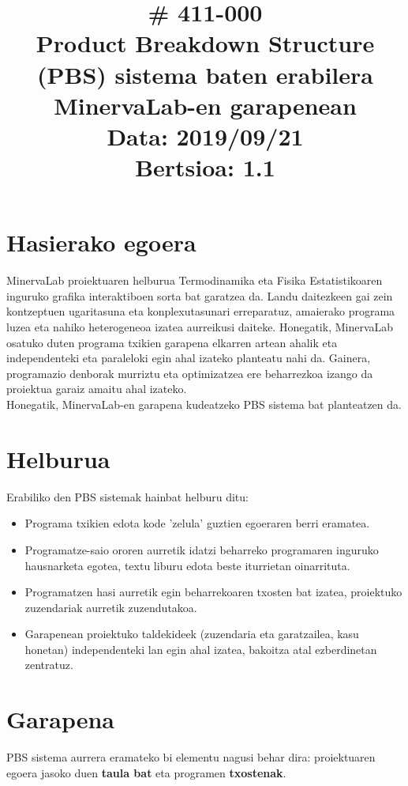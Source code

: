 \documentclass[10pt,a4paper]{article}
\title{\cf \# 411-000 \\ \vspace{5mm}
					Product Breakdown Structure (PBS) sistema baten erabilera MinervaLab-en garapenean \\
\normalsize \vspace{5mm} Data: 2019/09/21 \\
 			\vspace{3mm} Bertsioa: 1.1}
\date{}
\begin{document}
\maketitle
\thispagestyle{fancy}

\section{Hasierako egoera}
MinervaLab proiektuaren helburua Termodinamika eta Fisika Estatistikoaren inguruko grafika interaktiboen sorta bat garatzea da. Landu daitezkeen gai zein kontzeptuen ugaritasuna eta konplexutasunari erreparatuz, amaierako programa luzea eta nahiko heterogeneoa izatea aurreikusi daiteke. Honegatik, MinervaLab osatuko duten programa txikien garapena elkarren artean ahalik eta independenteki eta paraleloki egin ahal izateko planteatu nahi da. Gainera, programazio denborak murriztu eta optimizatzea ere beharrezkoa izango da proiektua garaiz amaitu ahal izateko.
\\

Honegatik, MinervaLab-en garapena kudeatzeko PBS sistema bat planteatzen da. 

\section{Helburua}
Erabiliko den PBS sistemak hainbat helburu ditu:
\begin{itemize}
\item Programa txikien edota kode 'zelula' guztien egoeraren berri eramatea.
\item Programatze-saio ororen aurretik idatzi beharreko programaren inguruko hausnarketa egotea, textu liburu edota beste iturrietan oinarrituta.
\item  Programatzen hasi aurretik egin beharrekoaren txosten bat izatea, proiektuko zuzendariak aurretik zuzendutakoa.
\item Garapenean proiektuko taldekideek (zuzendaria eta garatzailea, kasu honetan) independenteki lan egin ahal izatea, bakoitza atal ezberdinetan zentratuz.
\end{itemize}

 
\section{Garapena}
PBS sistema aurrera eramateko bi elementu nagusi behar dira: proiektuaren egoera jasoko duen \textbf{taula bat} eta programen \textbf{txostenak}.
\\
\end{document}
